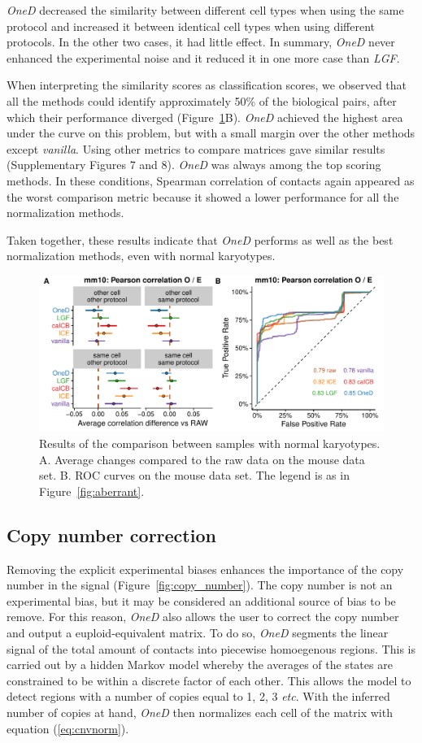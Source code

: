 \documentclass{bioinfo}
\begin{document}
\textit{OneD} decreased the similarity between different cell types when
using the same protocol and increased it between identical cell types when
using different protocols. In the other two cases, it had little effect.
In summary, \textit{OneD} never enhanced the experimental noise and it
reduced it in one more case than \textit{LGF}.

When interpreting the similarity scores as classification scores, we
observed that all the methods could identify approximately 50\% of the
biological pairs, after which their performance diverged
(Figure~\ref{fig:normal}B). \textit{OneD} achieved the highest area under
the curve on this problem, but with a small margin over the other methods
except \textit{vanilla}. Using other metrics to compare matrices gave similar
results (Supplementary Figures 7 and 8). \textit{OneD} was always among the top
scoring methods. In these conditions, Spearman correlation of contacts again
appeared as the worst comparison metric because it showed a lower performance
for all the normalization methods.

Taken together, these results indicate that \textit{OneD} performs as well
as the best normalization methods, even with normal karyotypes.

\begin{figure}
\centerline{\includegraphics[width=.50\textwidth]
  {img/correlation_normal_figure4.pdf}}
\caption{
Results of the comparison between samples with normal karyotypes. A.
Average changes compared to the raw data on the mouse data set.  B. ROC
curves on the mouse data set. The legend is as in
Figure~\ref{fig:aberrant}.}
\label{fig:normal}
\end{figure}



\subsection{Copy number correction}

Removing the explicit experimental biases enhances the importance of the
copy number in the signal (Figure~\ref{fig:copy_number}). The copy number
is not an experimental bias, but it may be considered an additional source
of bias to be remove. For this reason, \textit{OneD} also allows the user
to correct the copy number and output a euploid-equivalent matrix. To do
so, \textit{OneD} segments the linear signal of the total amount of contacts
into piecewise homoegenous regions. This is carried out by a hidden Markov model
whereby the averages of the states are constrained to be within a discrete
factor of each other. This allows the model to detect regions with a number of
copies equal to 1, 2, 3 \textit{etc}. With the inferred number of copies at
hand, \textit{OneD} then normalizes each cell of the matrix with equation
(\ref{eq:cnvnorm}).
\end{document}
